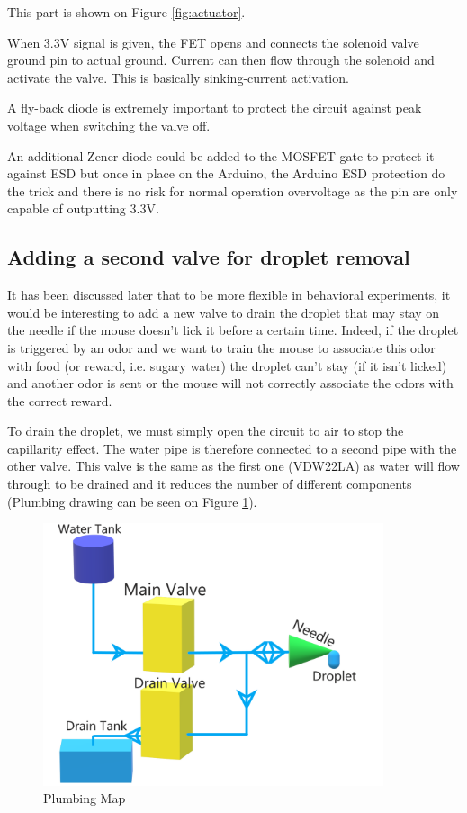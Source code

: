 \documentclass[a4paper]{article}
\begin{document}
This part is shown on Figure \ref{fig:actuator}.

When 3.3V signal is given, the FET opens and connects the solenoid valve ground pin to actual ground. Current can then flow through the solenoid and activate the valve. This is basically sinking-current activation.

A fly-back diode is extremely important to protect the circuit against peak voltage when switching the valve off.

An additional Zener diode could be added to the MOSFET gate to protect it against ESD but once in place on the Arduino, the Arduino ESD protection do the trick and there is no risk for normal operation overvoltage as the pin are only capable of outputting 3.3V.


\subsection{Adding a second valve for droplet removal}
It has been discussed later that to be more flexible in behavioral experiments, it would be interesting to add a new valve to drain the droplet that may stay on the needle if the mouse doesn't lick it before a certain time.
Indeed, if the droplet is triggered by an odor and we want to train the mouse to associate this odor with food (or reward, i.e. sugary water) the droplet can't stay (if it isn't licked) and another odor is sent or the mouse will not correctly associate the odors with the correct reward.

To drain the droplet, we must simply open the circuit to air to stop the capillarity effect. The water pipe is therefore connected to a second pipe with the other valve.
This valve is the same as the first one (VDW22LA) as water will flow through to be drained and it reduces the number of different components (Plumbing drawing can be seen on Figure \ref{fig:plumbing}).

\begin{figure}[h!]
    \centering
    \includegraphics[width =10cm]{images/ValveMap.png}
    \caption{Plumbing Map}
    \label{fig:plumbing}
\end{figure}
\end{document}
